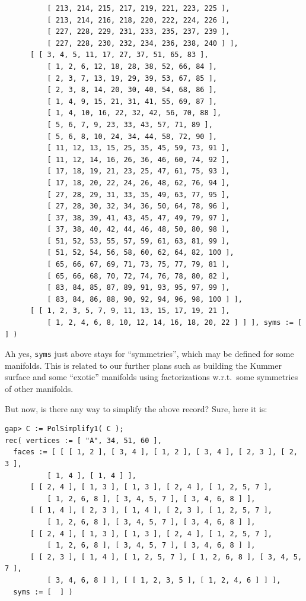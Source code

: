 \documentclass{article}
\begin{document}
\begin{verbatim}
          [ 213, 214, 215, 217, 219, 221, 223, 225 ], 
          [ 213, 214, 216, 218, 220, 222, 224, 226 ], 
          [ 227, 228, 229, 231, 233, 235, 237, 239 ], 
          [ 227, 228, 230, 232, 234, 236, 238, 240 ] ], 
      [ [ 3, 4, 5, 11, 17, 27, 37, 51, 65, 83 ], 
          [ 1, 2, 6, 12, 18, 28, 38, 52, 66, 84 ], 
          [ 2, 3, 7, 13, 19, 29, 39, 53, 67, 85 ], 
          [ 2, 3, 8, 14, 20, 30, 40, 54, 68, 86 ], 
          [ 1, 4, 9, 15, 21, 31, 41, 55, 69, 87 ], 
          [ 1, 4, 10, 16, 22, 32, 42, 56, 70, 88 ], 
          [ 5, 6, 7, 9, 23, 33, 43, 57, 71, 89 ], 
          [ 5, 6, 8, 10, 24, 34, 44, 58, 72, 90 ], 
          [ 11, 12, 13, 15, 25, 35, 45, 59, 73, 91 ], 
          [ 11, 12, 14, 16, 26, 36, 46, 60, 74, 92 ], 
          [ 17, 18, 19, 21, 23, 25, 47, 61, 75, 93 ], 
          [ 17, 18, 20, 22, 24, 26, 48, 62, 76, 94 ], 
          [ 27, 28, 29, 31, 33, 35, 49, 63, 77, 95 ], 
          [ 27, 28, 30, 32, 34, 36, 50, 64, 78, 96 ], 
          [ 37, 38, 39, 41, 43, 45, 47, 49, 79, 97 ], 
          [ 37, 38, 40, 42, 44, 46, 48, 50, 80, 98 ], 
          [ 51, 52, 53, 55, 57, 59, 61, 63, 81, 99 ], 
          [ 51, 52, 54, 56, 58, 60, 62, 64, 82, 100 ], 
          [ 65, 66, 67, 69, 71, 73, 75, 77, 79, 81 ], 
          [ 65, 66, 68, 70, 72, 74, 76, 78, 80, 82 ], 
          [ 83, 84, 85, 87, 89, 91, 93, 95, 97, 99 ], 
          [ 83, 84, 86, 88, 90, 92, 94, 96, 98, 100 ] ], 
      [ [ 1, 2, 3, 5, 7, 9, 11, 13, 15, 17, 19, 21 ], 
          [ 1, 2, 4, 6, 8, 10, 12, 14, 16, 18, 20, 22 ] ] ], syms := [  ] )
\end{verbatim} \label{endS6minusS4}
Ah yes, \verb|syms| just above stays for ``symmetries'', which may be defined for some manifolds. This is related to our further plans such as building the Kummer surface and some ``exotic'' manifolds using factorizations w.r.t.\ some symmetries of other manifolds.

But now, is there any way to simplify the above record? Sure, here it is:
\begin{verbatim}
gap> C := PolSimplify1( C );
rec( vertices := [ "A", 34, 51, 60 ], 
  faces := [ [ [ 1, 2 ], [ 3, 4 ], [ 1, 2 ], [ 3, 4 ], [ 2, 3 ], [ 2, 3 ], 
          [ 1, 4 ], [ 1, 4 ] ], 
      [ [ 2, 4 ], [ 1, 3 ], [ 1, 3 ], [ 2, 4 ], [ 1, 2, 5, 7 ], 
          [ 1, 2, 6, 8 ], [ 3, 4, 5, 7 ], [ 3, 4, 6, 8 ] ], 
      [ [ 1, 4 ], [ 2, 3 ], [ 1, 4 ], [ 2, 3 ], [ 1, 2, 5, 7 ], 
          [ 1, 2, 6, 8 ], [ 3, 4, 5, 7 ], [ 3, 4, 6, 8 ] ], 
      [ [ 2, 4 ], [ 1, 3 ], [ 1, 3 ], [ 2, 4 ], [ 1, 2, 5, 7 ], 
          [ 1, 2, 6, 8 ], [ 3, 4, 5, 7 ], [ 3, 4, 6, 8 ] ], 
      [ [ 2, 3 ], [ 1, 4 ], [ 1, 2, 5, 7 ], [ 1, 2, 6, 8 ], [ 3, 4, 5, 7 ], 
          [ 3, 4, 6, 8 ] ], [ [ 1, 2, 3, 5 ], [ 1, 2, 4, 6 ] ] ], 
  syms := [  ] )
\end{verbatim}
\end{document}
